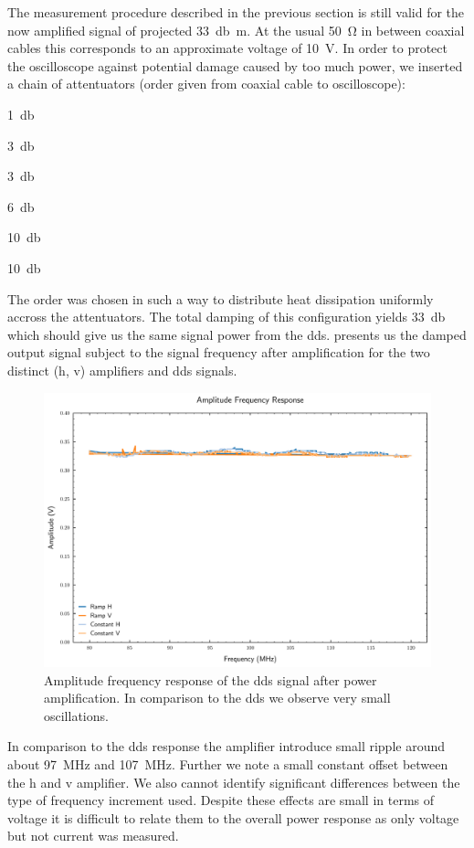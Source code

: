 The measurement procedure described in the previous section is still valid
for the now amplified signal of projected \SI{33}{\decibel\meter}. At the
usual \SI{50}{\ohm} in between coaxial cables this corresponds to an
approximate voltage of \SI{10}{\volt}. In order to protect the oscilloscope
against potential damage caused by too much power, we inserted a chain of
attentuators (order given from coaxial cable to oscilloscope):
\begin{inparaenum}
  \item \SI{1}{\decibel}
  \item \SI{3}{\decibel}
  \item \SI{3}{\decibel}
  \item \SI{6}{\decibel}
  \item \SI{10}{\decibel}
  \item \SI{10}{\decibel}
\end{inparaenum}
The order was chosen in such a way to distribute heat dissipation uniformly
accross the attentuators. The total damping of this configuration yields
\SI{33}{\decibel} which should give us the same signal power from the
\gls{dds}.  presents us the damped
output signal subject to the signal frequency after amplification for the two
distinct (\gls{h}, \gls{v}) amplifiers and \gls{dds} signals.
\begin{figure}[htb]
  \centering
  \includegraphics[width=.9\textwidth]{../figure/signal/amplification/response.pdf}
  \caption{Amplitude frequency response of the \gls{dds} signal after power
    amplification. In comparison to the \gls{dds} we observe very small
    oscillations.
  }\label{fig:signal_amplification_response}
\end{figure}
In comparison to the \gls{dds} response the amplifier introduce small ripple
around about \SI{97}{\mega\hertz} and \SI{107}{\mega\hertz}. Further we note
a small constant offset between the \gls{h} and \gls{v} amplifier. We also
cannot identify significant differences between the type of frequency
increment used. Despite these effects are small in terms of voltage it is
difficult to relate them to the overall power response as only voltage but
not current was measured.


